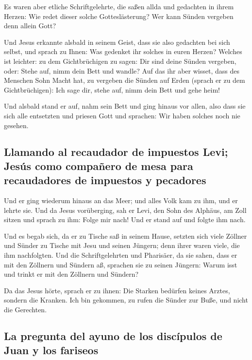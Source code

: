  Es waren aber etliche Schriftgelehrte, die saßen allda
und gedachten in ihrem Herzen:  Wie redet dieser solche
Gotteslästerung? Wer kann Sünden vergeben denn allein Gott?

 Und Jesus erkannte alsbald in seinem Geist, dass sie also
gedachten bei sich selbst, und sprach zu Ihnen: Was gedenket ihr solches
in euren Herzen?  Welches ist leichter: zu dem
Gichtbrüchigen zu sagen: Dir sind deine Sünden vergeben, oder: Stehe
auf, nimm dein Bett und wandle?  Auf das ihr aber wisset,
dass des Menschen Sohn Macht hat, zu vergeben die Sünden auf Erden
(sprach er zu dem Gichtbrüchigen):  Ich sage dir, stehe
auf, nimm dein Bett und gehe heim!

 Und alsbald stand er auf, nahm sein Bett und ging hinaus
vor allen, also dass sie sich alle entsetzten und priesen Gott und
sprachen: Wir haben solches noch nie gesehen.

\hypertarget{llamando-al-recaudador-de-impuestos-levi-jesuxfas-como-compauxf1ero-de-mesa-para-recaudadores-de-impuestos-y-pecadores}{%
\subsection{Llamando al recaudador de impuestos Levi; Jesús como
compañero de mesa para recaudadores de impuestos y
pecadores}\label{llamando-al-recaudador-de-impuestos-levi-jesuxfas-como-compauxf1ero-de-mesa-para-recaudadores-de-impuestos-y-pecadores}}

 Und er ging wiederum hinaus an das Meer; und alles Volk
kam zu ihm, und er lehrte sie.  Und da Jesus vorüberging,
sah er Levi, den Sohn des Alphäus, am Zoll sitzen und sprach zu ihm:
Folge mir nach! Und er stand auf und folgte ihm nach.

 Und es begab sich, da er zu Tische saß in seinem Hause,
setzten sich viele Zöllner und Sünder zu Tische mit Jesu und seinen
Jüngern; denn ihrer waren viele, die ihm nachfolgten. 
Und die Schriftgelehrten und Pharisäer, da sie sahen, dass er mit den
Zöllnern und Sündern aß, sprachen sie zu seinen Jüngern: Warum isst und
trinkt er mit den Zöllnern und Sündern?

 Da das Jesus hörte, sprach er zu ihnen: Die Starken
bedürfen keines Arztes, sondern die Kranken. Ich bin gekommen, zu rufen
die Sünder zur Buße, und nicht die Gerechten.

\hypertarget{la-pregunta-del-ayuno-de-los-discuxedpulos-de-juan-y-los-fariseos}{%
\subsection{La pregunta del ayuno de los discípulos de Juan y los
fariseos}\label{la-pregunta-del-ayuno-de-los-discuxedpulos-de-juan-y-los-fariseos}}


